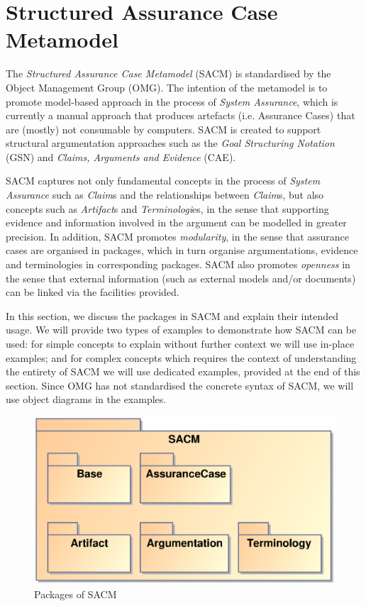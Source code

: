 \section{Structured Assurance Case Metamodel}
\label{sec:sacm}
The \textit{Structured Assurance Case Metamodel} (SACM) is standardised by the Object Management Group (OMG). The intention of the metamodel is to promote model-based approach in the process of \textit{System Assurance}, which is currently a manual approach that produces artefacts (i.e. Assurance Cases) that are (mostly) not consumable by computers. SACM is created to support structural argumentation approaches such as the \textit{Goal Structuring Notation} (GSN) and \textit{Claims, Arguments and Evidence} (CAE). 

SACM captures not only fundamental concepts in the process of \textit{System Assurance} such as \textit{Claim}s and the relationships between \textit{Claim}s, but also concepts such as \textit{Artifact}s and \textit{Terminologi}es, in the sense that supporting evidence and information involved in the argument can be modelled in greater precision. In addition, SACM promotes \textit{modularity}, in the sense that assurance cases are organised in packages, which in turn organise argumentations, evidence and terminologies in corresponding packages. SACM also promotes \textit{openness} in the sense that external information (such as external models and/or documents) can be linked via the facilities provided. 

In this section, we discuss the packages in SACM and explain their intended usage. 
We will provide two types of examples to demonstrate how SACM can be used: for simple concepts to explain without further context we will use in-place examples; and for complex concepts which requires the context of understanding the entirety of SACM we will use dedicated examples, provided at the end of this section.
Since OMG has not standardised the concrete syntax of SACM, we will use object diagrams in the examples. 

\begin{figure}
	\centering
	\includegraphics[width=0.6\linewidth]{Overview.eps}
	\caption{Packages of SACM}
	\label{fig:overview}
\end{figure}

